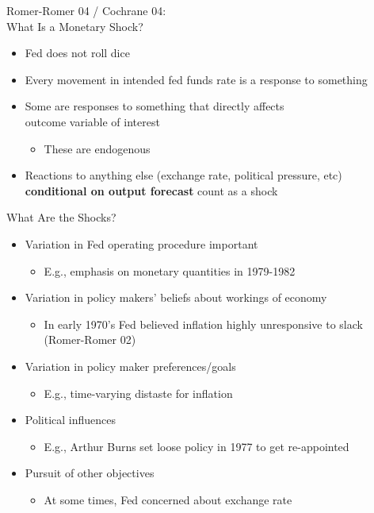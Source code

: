 \documentclass[11pt,aspectratio=169,xcolor={dvipsnames},hyperref={pdftex,pdfpagemode=UseNone,hidelinks,pdfdisplaydoctitle=true},usepdftitle=false]{beamer}
\begin{document}
\begin{frame}{Romer-Romer 04 / Cochrane 04: \\ What Is a Monetary Shock?}
\begin{itemize}
\itemsep1em
\item Fed does not roll dice 
\item Every movement in intended fed funds rate is a response to something
\item Some are responses to something that directly affects \\ outcome variable of interest
\begin{itemize}
\item These are endogenous
\end{itemize}
\item Reactions to anything else (exchange rate, political pressure, etc) \\ \textbf{conditional on output forecast} count as a shock
\end{itemize}
\end{frame}


\begin{frame}{What Are the Shocks?}
\begin{itemize}
	\item Variation in Fed operating procedure important
	\begin{itemize}
		\item E.g., emphasis on monetary quantities in 1979-1982
	\end{itemize}
	\item Variation in policy makers' beliefs about workings of economy
	\begin{itemize}
		\item In early 1970's Fed believed inflation highly unresponsive to slack \\ (Romer-Romer 02)
	\end{itemize}
	\item Variation in policy maker preferences/goals
	\begin{itemize}
		\item E.g., time-varying distaste for inflation
	\end{itemize}
	\item Political influences
	\begin{itemize}
		\item E.g., Arthur Burns set loose policy in 1977 to get re-appointed
	\end{itemize}
	\item Pursuit of other objectives
	\begin{itemize}
		\item At some times, Fed concerned about exchange rate
	\end{itemize}
\end{itemize}
\end{frame}
\end{document}
